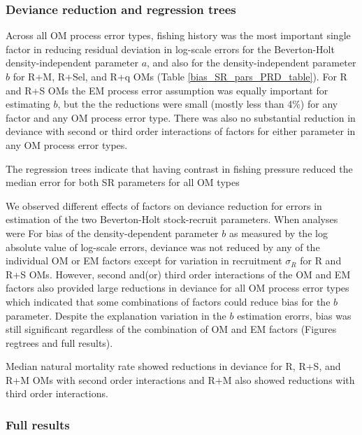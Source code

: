 \documentclass[
  12pt,
]{article}
\begin{document}
\subsubsection*{Deviance reduction and regression
trees}\label{deviance-reduction-and-regression-trees}

Across all OM process error types, fishing history was the most
important single factor in reducing residual deviation in log-scale
errors for the Beverton-Holt density-independent parameter \(a\), and
also for the density-independent parameter \(b\) for R+M, R+Sel, and R+q
OMs (Table \ref{bias_SR_pars_PRD_table}). For R and R+S OMs the EM
process error assumption was equally important for estimating \(b\), but
the the reductions were small (mostly less than 4\%) for any factor and
any OM process error type. There was also no substantial reduction in
deviance with second or third order interactions of factors for either
parameter in any OM process error types.

The regression trees indicate that having contrast in fishing pressure
reduced the median error for both SR parameters for all OM types

We observed different effects of factors on deviance reduction for
errors in estimation of the two Beverton-Holt stock-recruit parameters.
When analyses were For bias of the density-dependent parameter \(b\) as
measured by the log absolute value of log-scale errors, deviance was not
reduced by any of the individual OM or EM factors except for variation
in recruitment \(\sigma_R\) for R and R+S OMs. However, second and(or)
third order interactions of the OM and EM factors also provided large
reductions in deviance for all OM process error types which indicated
that some combinations of factors could reduce bias for the \(b\)
parameter. Despite the explanation variation in the \(b\) estimation
erorrs, bias was still significant regardless of the combination of OM
and EM factors (Figures regtrees and full results).

Median natural mortality rate showed reductions in deviance for R, R+S,
and R+M OMs with second order interactions and R+M also showed
reductions with third order interactions.

\subsubsection*{Full results}\label{full-results-3}
\end{document}
